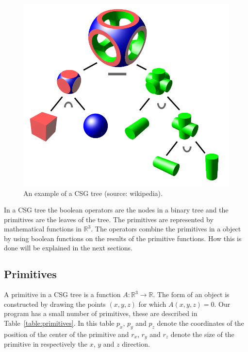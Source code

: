 \documentclass[a4paper,10pt,twoside]{report}
\begin{document}
    \begin{figure}[h]
        \begin{center}
            \includegraphics[scale=.2]{./images/csgtree.png}
        \end{center}
        \caption{An example of a CSG tree (source: wikipedia\cite{img:wiki_csg_tree}).}
        \label{figure:csg_tree}
    \end{figure}

    In a CSG tree the boolean operators are the nodes in a binary tree and the primitives are the leaves of the tree. The primitives are represented by mathematical functions in $\mathbb{R}^3$. The operators combine the primitives in a object by using boolean functions on the results of the primitive functions. How this is done will be explained in the next sections.\\

\subsection{Primitives}
    A primitive in a CSG tree is a function $A:\mathbb{R}^3 \rightarrow \mathbb{R}$. The form of an object is constructed by drawing the points $(x,y,z)$ for which $A(x,y,z)=0$. Our program has a small number of primitives, these are described in Table~\ref{table:primitives}. In this table $p_x$, $p_y$ and $p_z$ denote the coordinates of the position of the center of the primitive and $r_x$, $r_y$ and $r_z$ denote the size of the primitive in respectively the $x$, $y$ and $z$ direction.\\
\end{document}
